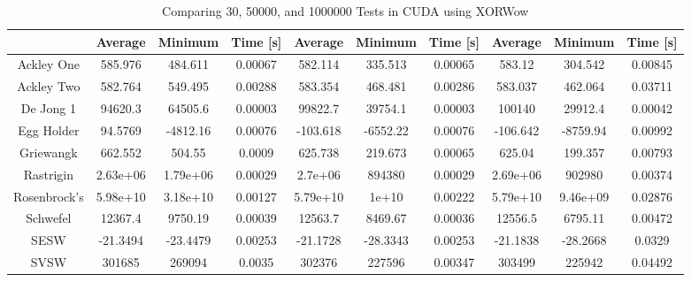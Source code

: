 \documentclass{article}
\begin{document}
	\begin{table}[h]
        \begin{centering}
            \begin{tabular}{|c||c|c|c||c|c|c||c|c|c|}
                \hline
                            & Average & Minimum & Time [s] & Average & Minimum & Time [s] & Average & Minimum & Time [s] \\
                \hline
                \hline
                Ackley One & 585.976 & 484.611 & 0.00067 & 582.114 & 335.513 & 0.00065 & 583.12 & 304.542 & 0.00845 \\ 
                \hline
                Ackley Two & 582.764 & 549.495 & 0.00288 & 583.354 & 468.481 & 0.00286 & 583.037 & 462.064 & 0.03711 \\
                \hline
                De Jong 1 & 94620.3 & 64505.6 & 0.00003 & 99822.7 & 39754.1 & 0.00003 & 100140 & 29912.4 & 0.00042\\
                \hline
                Egg Holder & 94.5769 & -4812.16 & 0.00076 & -103.618 & -6552.22 & 0.00076 & -106.642 & -8759.94 & 0.00992 \\
                \hline
                Griewangk & 662.552 & 504.55 & 0.0009 & 625.738 & 219.673 & 0.00065 & 625.04 & 199.357 & 0.00793 \\
                \hline
                Rastrigin & 2.63e+06 & 1.79e+06 & 0.00029 & 2.7e+06 & 894380 & 0.00029 & 2.69e+06 & 902980 & 0.00374 \\
                \hline
                Rosenbrock's & 5.98e+10 & 3.18e+10 & 0.00127 & 5.79e+10 & 1e+10 & 0.00222 & 5.79e+10 & 9.46e+09 & 0.02876\\
                \hline
                Schwefel & 12367.4 & 9750.19 & 0.00039 & 12563.7 & 8469.67 & 0.00036 & 12556.5 & 6795.11 & 0.00472 \\
                \hline
                SESW & -21.3494 & -23.4479 & 0.00253 & -21.1728 & -28.3343 & 0.00253 & -21.1838 & -28.2668 & 0.0329 \\
                \hline
                SVSW & 301685 & 269094 & 0.0035 & 302376 & 227596 & 0.00347 & 303499 & 225942 & 0.04492 \\
                \hline
            \end{tabular}
            \caption{Comparing 30, 50000, and 1000000 Tests in CUDA using XORWow}
        \end{centering}
        \end{table}
\pagebreak
\end{document}
